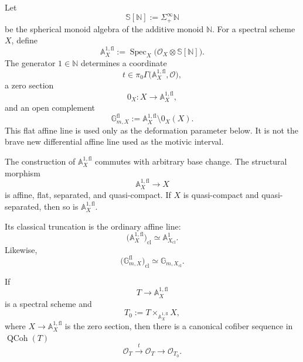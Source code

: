 \begin{construction}
\label{constr:flat-spectral-affine-line}
Let
\[
    \mathbb S[\mathbb N]
    :=
    \Sigma^\infty_+\mathbb N
\]
be the spherical monoid algebra of the additive monoid \(\mathbb N\).  For a
spectral scheme \(X\), define
\[
    \mathbb A^{1,\mathrm{fl}}_X
    :=
    \operatorname{Spec}_X
    \bigl(
      \mathcal O_X\otimes\mathbb S[\mathbb N]
    \bigr).
\]
The generator \(1\in\mathbb N\) determines a coordinate
\[
    t\in
    \pi_0
    \Gamma
    \bigl(
      \mathbb A^{1,\mathrm{fl}}_X,
      \mathcal O
    \bigr),
\]
a zero section
\[
    0_X:X\longrightarrow\mathbb A^{1,\mathrm{fl}}_X,
\]
and an open complement
\[
    \mathbb G^{\mathrm{fl}}_{m,X}
    :=
    \mathbb A^{1,\mathrm{fl}}_X\setminus0_X(X).
\]
This flat affine line is used only as the deformation parameter below.  It
is not the brave new differential affine line used as the motivic interval.
\end{construction}

\begin{proposition}
\label{prop:flat-affine-line-properties}
The construction of
\(\mathbb A^{1,\mathrm{fl}}_X\) commutes with arbitrary base change.  The
structural morphism
\[
    \mathbb A^{1,\mathrm{fl}}_X
    \longrightarrow
    X
\]
is affine, flat, separated, and quasi-compact.  If \(X\) is quasi-compact
and quasi-separated, then so is \(\mathbb A^{1,\mathrm{fl}}_X\).

Its classical truncation is the ordinary affine line:
\[
    \bigl(
      \mathbb A^{1,\mathrm{fl}}_X
    \bigr)_{\mathrm{cl}}
    \simeq
    \mathbb A^1_{X_{\mathrm{cl}}}.
\]
Likewise,
\[
    \bigl(
      \mathbb G^{\mathrm{fl}}_{m,X}
    \bigr)_{\mathrm{cl}}
    \simeq
    \mathbb G_{m,X_{\mathrm{cl}}}.
\]

If
\[
    T\longrightarrow\mathbb A^{1,\mathrm{fl}}_X
\]
is a spectral scheme and
\[
    T_0:=T\times_{\mathbb A^{1,\mathrm{fl}}_X}X,
\]
where \(X\to\mathbb A^{1,\mathrm{fl}}_X\) is the zero section, then there is
a canonical cofiber sequence in \(\operatorname{QCoh}(T)\)
\[
    \mathcal O_T
    \xrightarrow{t}
    \mathcal O_T
    \longrightarrow
    \mathcal O_{T_0}.
\]
\end{proposition}

